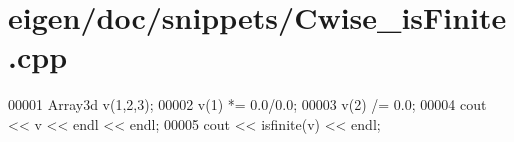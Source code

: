 \hypertarget{eigen_2doc_2snippets_2_cwise__is_finite_8cpp_source}{}\section{eigen/doc/snippets/\+Cwise\+\_\+is\+Finite.cpp}
\label{eigen_2doc_2snippets_2_cwise__is_finite_8cpp_source}

\begin{DoxyCode}
00001 Array3d v(1,2,3);
00002 v(1) *= 0.0/0.0;
00003 v(2) /= 0.0;
00004 cout << v << endl << endl;
00005 cout << isfinite(v) << endl;
\end{DoxyCode}
